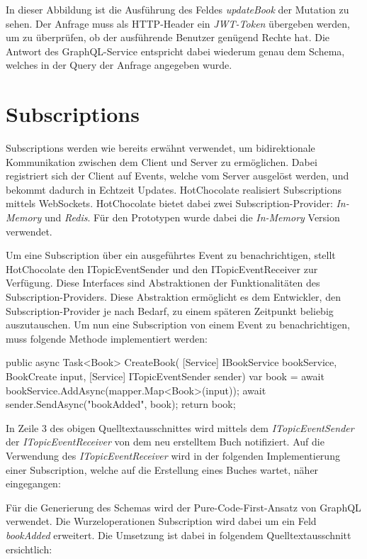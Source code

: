 In dieser Abbildung ist die Ausführung des Feldes \textit{updateBook} der Mutation zu sehen.
Der Anfrage muss als HTTP-Header ein \textit{JWT-Token} übergeben werden, um zu überprüfen, ob der ausführende Benutzer genügend Rechte hat.
Die Antwort des GraphQL-Service entspricht dabei wiederum genau dem Schema, welches in der Query der Anfrage angegeben wurde.


\section{Subscriptions}
Subscriptions werden wie bereits erwähnt verwendet, um bidirektionale Kommunikation zwischen dem Client und Server zu ermöglichen.
Dabei registriert sich der Client auf Events, welche vom Server ausgelöst werden, und bekommt dadurch in Echtzeit Updates.
HotChocolate realisiert Subscriptions mittels WebSockets.
HotChocolate bietet dabei zwei Subscription-Provider: \textit{In-Memory} und \textit{Redis}.
Für den Prototypen wurde dabei die \textit{In-Memory} Version verwendet.

Um eine Subscription über ein ausgeführtes Event zu benachrichtigen, stellt HotChocolate den ITopicEventSender und den ITopicEventReceiver zur Verfügung.
Diese Interfaces sind Abstraktionen der Funktionalitäten des Subscription-Providers.
Diese Abstraktion ermöglicht es dem Entwickler, den Subscription-Provider je nach Bedarf, zu einem späteren Zeitpunkt beliebig auszutauschen.
Um nun eine Subscription von einem Event zu benachrichtigen, muss folgende Methode implementiert werden:
\begin{JsCode}
public async Task<Book> CreateBook(
    [Service] IBookService bookService,
    BookCreate input,
    [Service] ITopicEventSender sender)
{
    var book = await bookService.AddAsync(mapper.Map<Book>(input));
    await sender.SendAsync("bookAdded", book);
    return book;
}
\end{JsCode}

In Zeile 3 des obigen Quelltextausschnittes wird mittels dem \textit{ITopicEventSender} der \textit{ITopicEventReceiver} von dem neu erstelltem Buch notifiziert.
Auf die Verwendung des \textit{ITopicEventReceiver} wird in der folgenden Implementierung einer Subscription, welche auf die Erstellung eines Buches wartet, näher eingegangen:

Für die Generierung des Schemas wird der Pure-Code-First-Ansatz von GraphQL verwendet.
Die Wurzeloperationen Subscription wird dabei um ein Feld \textit{bookAdded} erweitert.
Die Umsetzung ist dabei in folgendem Quelltextausschnitt ersichtlich:

